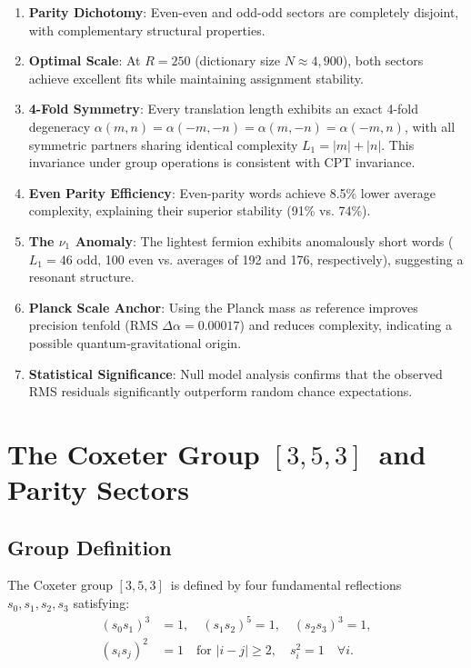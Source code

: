 \documentclass[11pt,a4paper]{article}
\newcommand{\tgrp}{\ensuremath{[3,5,3]}}
\begin{document}
\begin{enumerate}
\item \textbf{Parity Dichotomy}: Even-even and odd-odd sectors are completely disjoint, with complementary structural properties.
\item \textbf{Optimal Scale}: At $R=250$ (dictionary size $N \approx 4{,}900$), both sectors achieve excellent fits while maintaining assignment stability.
\item \textbf{4-Fold Symmetry}: Every translation length exhibits an exact 4-fold degeneracy $\alpha(m,n) = \alpha(-m,-n) = \alpha(m,-n) = \alpha(-m,n)$, with all symmetric partners sharing identical complexity $L_1 = |m| + |n|$. This invariance under group operations is consistent with CPT invariance.
\item \textbf{Even Parity Efficiency}: Even-parity words achieve 8.5\% lower average complexity, explaining their superior stability (91\% vs. 74\%).
\item \textbf{The $\nu_1$ Anomaly}: The lightest fermion exhibits anomalously short words ($L_1 = 46$ odd, 100 even vs. averages of 192 and 176, respectively), suggesting a resonant structure.
\item \textbf{Planck Scale Anchor}: Using the Planck mass as reference improves precision tenfold (RMS $\Delta\alpha = 0.00017$) and reduces complexity, indicating a possible quantum‑gravitational origin.
\item \textbf{Statistical Significance}: Null model analysis confirms that the observed RMS residuals significantly outperform random chance expectations.
\end{enumerate}

\section{The Coxeter Group \tgrp\ and Parity Sectors}

\subsection{Group Definition}

The Coxeter group \tgrp\ is defined by four fundamental reflections $s_0, s_1, s_2, s_3$ satisfying:
\begin{align}
(s_0 s_1)^3 &= 1, \quad (s_1 s_2)^5 = 1, \quad (s_2 s_3)^3 = 1, \\
(s_i s_j)^2 &= 1 \quad \text{for } |i-j| \ge 2, \quad s_i^2 = 1 \quad \forall i.
\end{align}
\end{document}
